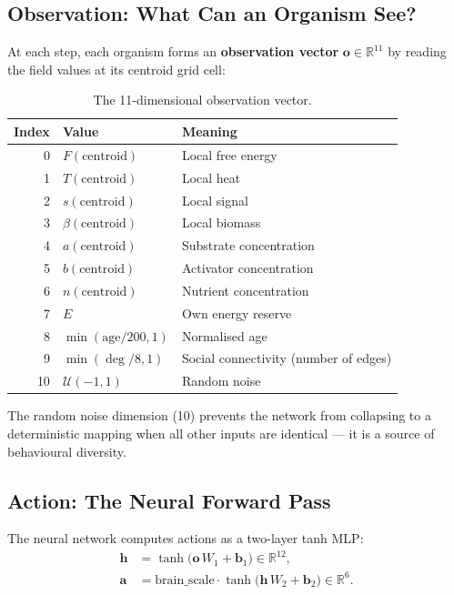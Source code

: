 \documentclass[12pt,a4paper]{article}
\newcommand{\RR}{\mathbb{R}}
\newcommand{\vv}[1]{\mathbf{#1}}
\begin{document}
\subsection{Observation: What Can an Organism See?}

At each step, each organism forms an
\textbf{observation vector} $\vv{o} \in \RR^{11}$ by reading
the field values at its centroid grid cell:

\begin{table}[h]
\centering
\renewcommand{\arraystretch}{1.2}
\begin{tabular}{rll}
\toprule
\textbf{Index} & \textbf{Value} & \textbf{Meaning} \\
\midrule
0 & $F(\text{centroid})$ & Local free energy \\
1 & $T(\text{centroid})$ & Local heat \\
2 & $s(\text{centroid})$ & Local signal \\
3 & $\beta(\text{centroid})$ & Local biomass \\
4 & $a(\text{centroid})$ & Substrate concentration \\
5 & $b(\text{centroid})$ & Activator concentration \\
6 & $n(\text{centroid})$ & Nutrient concentration \\
7 & $E$ & Own energy reserve \\
8 & $\min(\text{age}/200, 1)$ & Normalised age \\
9 & $\min(\deg/8, 1)$ & Social connectivity (number of edges) \\
10 & $\mathcal{U}(-1,1)$ & Random noise \\
\bottomrule
\end{tabular}
\caption{The 11-dimensional observation vector.}
\end{table}

The random noise dimension (10) prevents the network from
collapsing to a deterministic mapping when all other inputs
are identical — it is a source of behavioural diversity.

\subsection{Action: The Neural Forward Pass}

The neural network computes actions as a two-layer tanh MLP:
\begin{align}
  \vv{h} &= \tanh\!\bigl(\vv{o}\, W_1 + \vv{b}_1\bigr) \in \RR^{12}, \\
  \vv{a} &= \text{brain\_scale} \cdot \tanh\!\bigl(\vv{h}\, W_2 + \vv{b}_2\bigr)
    \in \RR^6.
  \label{eq:mlp}
\end{align}
\end{document}
